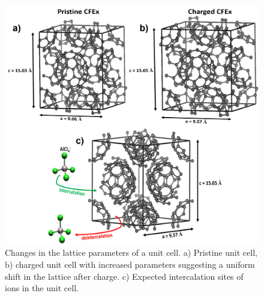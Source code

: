 \begin{figure}[h!]
  \centering
  \includegraphics[width=\textwidth]{Figures/chap5fig/cfexcrys}
    \caption{Changes in the lattice parameters of a  unit cell. a) Pristine unit cell, b) charged unit cell with increased parameters suggesting a uniform shift in the lattice after charge. c) Expected intercalation sites of  ions in the unit cell.}
  \label{Figures/chap5fig:cfexcrys}
\end{figure}

